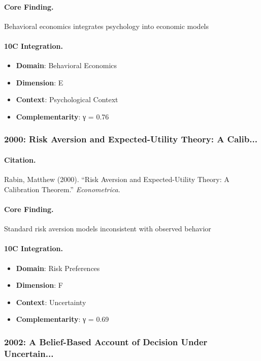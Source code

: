 \paragraph{Core Finding.}
Behavioral economics integrates psychology into economic models

\paragraph{10C Integration.}
\begin{itemize}[nosep]
  \item \textbf{Domain}: Behavioral Economics
  \item \textbf{Dimension}: E
  \item \textbf{Context}: Psychological Context
  \item \textbf{Complementarity}: γ = 0.76
\end{itemize}

\subsubsection{2000: Risk Aversion and Expected-Utility Theory: A Calib...}

\paragraph{Citation.}
Rabin, Matthew (2000). ``Risk Aversion and Expected-Utility Theory: A Calibration Theorem.''
\textit{Econometrica}.

\paragraph{Core Finding.}
Standard risk aversion models inconsistent with observed behavior

\paragraph{10C Integration.}
\begin{itemize}[nosep]
  \item \textbf{Domain}: Risk Preferences
  \item \textbf{Dimension}: F
  \item \textbf{Context}: Uncertainty
  \item \textbf{Complementarity}: γ = 0.69
\end{itemize}

\subsubsection{2002: A Belief-Based Account of Decision Under Uncertain...}

